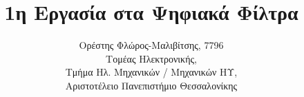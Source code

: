 \newcommand{\imagehere}[2]{%
\begin{figure}[H]%
\centering%
\texttt{[image: images/\#1]}%
\caption{#2}
\label{fig:#1}%
\end{figure}%
}

\title{1η Εργασία στα Ψηφιακά Φίλτρα}
\author{Ορέστης Φλώρος-Μαλιβίτσης, 7796\\
Τομέας Ηλεκτρονικής,\\
Τμήμα Ηλ. Μηχανικών / Μηχανικών ΗΥ,\\
Αριστοτέλειο Πανεπιστήμιο Θεσσαλονίκης}

\setcounter{section}{-1} %

\deactivateBG
\maketitle
\tableofcontents\newpage






